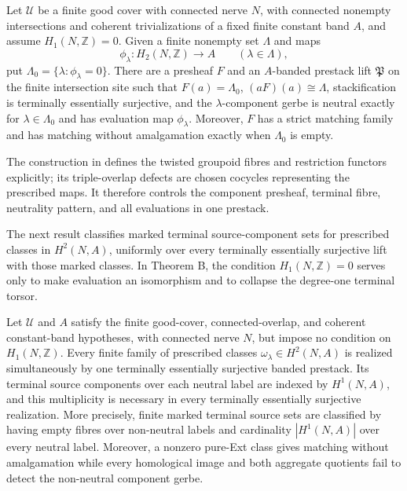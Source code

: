 \begin{theoremB}
Let \(\mathcal U\) be a finite good cover with connected nerve \(N\), with
connected nonempty intersections and coherent trivializations of a fixed
finite constant band \(A\), and assume \(H_1(N,\mathbb Z)=0\).  Given a
finite nonempty set \(\Lambda\) and maps
\[
 \phi_\lambda:H_2(N,\mathbb Z)\longrightarrow A
 \qquad(\lambda\in\Lambda),
\]
put \(\Lambda_0=\{\lambda:\phi_\lambda=0\}\).  There are a presheaf
\(F\) and an \(A\)-banded prestack lift \(\mathfrak P\) on the finite
intersection site such that \(F(a)=\Lambda_0\),
\((aF)(a)\cong\Lambda\), stackification is terminally essentially
surjective, and the \(\lambda\)-component gerbe is neutral exactly for
\(\lambda\in\Lambda_0\) and has evaluation map \(\phi_\lambda\).  Moreover,
\(F\) has a strict matching family and has matching without amalgamation
exactly when \(\Lambda_0\) is empty.
\end{theoremB}

The construction in 
defines the twisted groupoid fibres and restriction functors explicitly; its
triple-overlap defects are chosen cocycles representing the prescribed maps.
It therefore controls the component presheaf, terminal fibre, neutrality
pattern, and all evaluations in one prestack.

The next result classifies marked terminal source-component sets for
prescribed classes in \(H^2(N,A)\), uniformly over every terminally
essentially surjective lift with those marked classes.  In Theorem B, the
condition \(H_1(N,\mathbb Z)=0\) serves only to make evaluation an isomorphism
and to collapse the degree-one terminal torsor.

\begin{theoremC}
Let \(\mathcal U\) and \(A\) satisfy the finite good-cover,
connected-overlap, and coherent constant-band hypotheses, with connected
nerve \(N\), but impose no condition on \(H_1(N,\mathbb Z)\).  Every finite
family of prescribed classes \(\omega_\lambda\in H^2(N,A)\) is realized
simultaneously by one terminally essentially surjective banded prestack.  Its
terminal source components over each neutral label are indexed by
\(H^1(N,A)\), and this multiplicity is necessary in every terminally
essentially surjective realization.  More precisely, finite marked terminal
source sets are classified by having empty fibres over non-neutral labels and
cardinality \(|H^1(N,A)|\) over every neutral label.  Moreover, a nonzero
pure-Ext class gives matching without amalgamation while every homological
image and both aggregate quotients fail to detect the non-neutral component
gerbe.
\end{theoremC}

